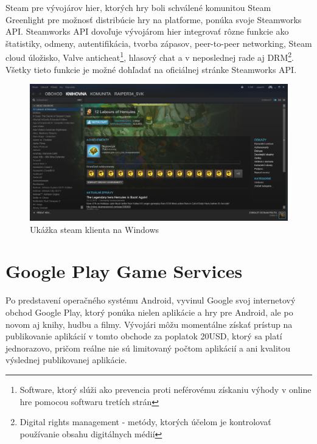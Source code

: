 Steam pre vývojárov hier, ktorých hry boli schválené komunitou Steam Greenlight pre možnosť distribúcie hry na platforme, ponúka svoje Steamworks API. Steamworks API dovoľuje vývojárom hier integrovať rôzne funkcie ako štatistiky, odmeny, autentifikácia, tvorba zápasov, peer-to-peer networking, Steam cloud úložisko, Valve anticheat\footnote{Software, ktorý slúži ako prevencia proti neférovému získaniu výhody v online hre pomocou softwaru tretích strán}, hlasový chat a v neposlednej rade aj DRM\footnote{Digital rights management - metódy, ktorých účelom je kontrolovať používanie obsahu digitálnych médií}. Všetky tieto funkcie je možné dohľadať na oficiálnej stránke Steamworks API. \cite{steamworks}
\begin{figure}[h]
  \centering
  \includegraphics[scale=0.27]{fig/steam.png}
  \caption{Ukážka steam klienta na Windows}
  \label{fig:steam}
\end{figure}

\section{Google Play Game Services}
Po predstavení operačného systému Android, vyvinul Google svoj internetový obchod Google Play, ktorý ponúka nielen aplikácie a hry pre Android, ale po novom aj knihy, hudbu a filmy. Vývojári môžu momentálne získať prístup na publikovanie aplikácií  v tomto obchode za poplatok 20USD, ktorý sa platí jednorazovo, pričom reálne nie sú limitovaný počtom aplikácií a ani kvalitou výslednej publikovanej aplikácie.

